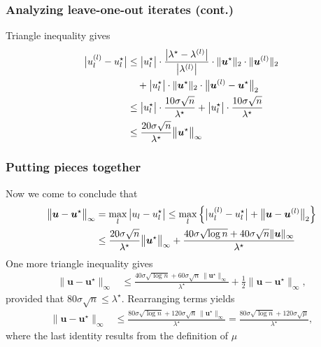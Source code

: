 \documentclass[compress,
mathserif,wide,%
]{beamer}
\begin{document}
\begin{frame}
	\frametitle{Analyzing leave-one-out iterates (cont.)}
	Triangle inequality gives
\begin{align*}
\big|u_{l}^{(l)}-u_{l}^{\star}\big|
& \leq\big|u_{l}^{\star}\big|\cdot\frac{\big|\lambda^{\star}-\lambda^{(l)}\big|}{\big|\lambda^{(l)}\big|} \cdot \|\bm{u}^{\star}\|_{2} \cdot \|\bm{u}^{(l)}\|_{2} \\
&\quad
	+ \big|u_{l}^{\star}\big|\cdot\|\bm{u}^{\star}\|_{2} \cdot \big\|\bm{u}^{(l)}-\bm{u}^{\star}\big\|_{2} \notag\\
 & \leq\big|u_{l}^{\star}\big|\cdot\frac{10\sigma\sqrt{n}}{\lambda^{\star}}+\big|u_{l}^{\star}\big|\cdot\frac{10\sigma\sqrt{n}}{\lambda^{\star}} \notag\\
 & \leq  \frac{20\sigma\sqrt{n}}{\lambda^{\star}} \big\|\bm{u}^{\star}\big\|_{\infty}
\end{align*}
\end{frame}

\begin{frame}
	\frametitle{Putting pieces together}
Now we come to conclude that 
%
\begin{align*}
\big\|\bm{u}-\bm{u}^{\star}\big\|_{\infty} & =\max_{l}\big|u_{l}-u_{l}^{\star}\big|\leq\max_{l}\Big\{\big|u_{l}^{(l)}-u_{l}^{\star}\big|+\big\|\bm{u}-\bm{u}^{(l)}\big\|_{2}\Big\} \notag\\
 & \leq \frac{20\sigma\sqrt{n}}{\lambda^{\star}} \big\|\bm{u}^{\star}\big\|_{\infty}
	+ \frac{40\sigma\sqrt{\log n}+40\sigma\sqrt{n}\|\bm{u}\|_{\infty}}{\lambda^{\star}}
\end{align*}
%
One more triangle inequality gives 
\begin{align*}
\big\|\bm{u}-\bm{u}^{\star}\big\|_{\infty}
	& \leq \frac{40\sigma\sqrt{\log n} + 60 \sigma \sqrt{n}\, \|\bm{u}^{\star}\|_{\infty} }{\lambda^{\star}}+\frac{1}{2}\big\|\bm{u}-\bm{u}^{\star}\big\|_{\infty},
\end{align*}
%
provided that $80\sigma\sqrt{n}\leq\lambda^{\star}$. Rearranging terms yields
\begin{align*}
	 \big\|\bm{u}-\bm{u}^{\star}\big\|_{\infty}
	 &\leq \frac{ 80\sigma\sqrt{\log n} + 120 \sigma \sqrt{n}\, \|\bm{u}^{\star}\|_{\infty} }{\lambda^{\star}}
	 = \frac{80\sigma\sqrt{\log n} + 120 \sigma \sqrt{\mu} }{\lambda^{\star}} ,
\end{align*}
%
where the last identity results from the definition of $\mu$
\end{frame}
\end{document}
